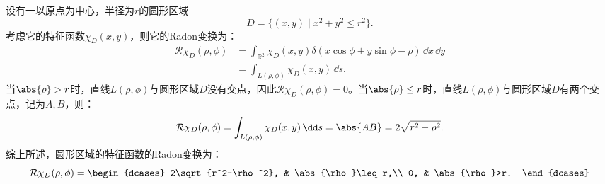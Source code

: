 \begin{example}[圆形特征函数的Radon变换]
    设有一以原点为中心，半径为$r$的圆形区域
    \begin{equation}
        D=\{(x,y)\mid x^2+y^2\leq r^2\}.
    \end{equation}
    考虑它的特征函数$\chi_D(x,y)$，则它的Radon变换为：
    \begin{align}
        \mathcal{R}\chi_D(\rho,\phi)&=\int_{\mathbb{R}^2}\chi_D(x,y)\delta(x\cos\phi+y\sin\phi-\rho)\,\dd x\,\dd y\nonumber\\
        &=\int_{L(\rho,\phi)}\chi_D(x,y)\,\dd s.
    \end{align}
    当$\abs{\rho}>r$时，直线$L(\rho,\phi)$与圆形区域$D$没有交点，因此$\mathcal{R}\chi_D(\rho,\phi)=0$。当$\abs{\rho}\leq r$时，直线$L(\rho,\phi)$与圆形区域$D$有两个交点，记为$A,B$，则：
    \begin{equation}
        \mathcal{R}\chi_D(\rho,\phi)=\int_{L(\rho,\phi)}\chi_D(x,y)\,\dd s=\abs{AB}=2\sqrt{r^2-\rho^2}.
    \end{equation}
    综上所述，圆形区域的特征函数的Radon变换为：
    \begin{equation}
        \mathcal{R}\chi_D(\rho,\phi)=\begin{dcases}
            2\sqrt{r^2-\rho^2}, & \abs{\rho}\leq r,\\
            0, & \abs{\rho}>r.
        \end{dcases}
    \end{equation}
\end{example}
